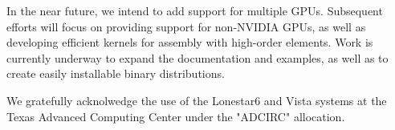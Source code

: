 In the near future, we intend to add support for multiple GPUs. Subsequent efforts will focus on providing support for non-NVIDIA GPUs, as well as developing efficient kernels for assembly with high-order elements. Work is currently underway to expand the documentation and examples, as well as to create easily installable binary distributions.



\begin{acknowledgement}
  We gratefully acknolwedge the use of the Lonestar6 and Vista systems at the Texas Advanced Computing Center under the "ADCIRC" allocation.        
\end{acknowledgement}






